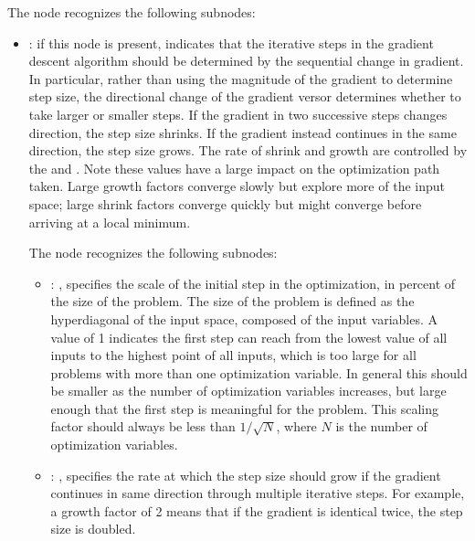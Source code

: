 \begin{itemize}
      The  node recognizes the following subnodes:
      \begin{itemize}
        \item {}:
          if this node is present, indicates that the iterative steps in the gradient
          descent algorithm should be determined by the sequential change in gradient. In
          particular, rather         than using the magnitude of the gradient to determine step
          size, the directional change of the         gradient versor determines whether to take
          larger or smaller steps. If the gradient in two successive         steps changes
          direction, the step size shrinks. If the gradient instead continues in the same
          direction, the step size grows. The rate of shrink and growth are controlled by the
                   and . Note these values have a large
          impact on the optimization path taken.         Large growth factors converge slowly but
          explore more of the input space; large shrink factors         converge quickly but might
          converge before arriving at a local minimum.

          The  node recognizes the following subnodes:
          \begin{itemize}
            \item {}: , 
              specifies the scale of the initial step in the optimization, in percent of the
              size of the problem. The size of the problem is defined as the hyperdiagonal of the
              input space, composed of the input variables. A value of 1 indicates the first step
              can reach from the lowest value of all inputs to the highest point of all inputs,
              which is too large for all problems with more than one optimization variable. In
              general this               should be smaller as the number of optimization variables
              increases, but large enough               that the first step is meaningful for the
              problem. This scaling factor should always               be less than $1/\sqrt{N}$,
              where $N$ is the number of optimization variables. 

            \item {}: , 
              specifies the rate at which the step size should grow if the gradient continues in
              same direction through multiple iterative steps. For example, a growth factor of 2
              means               that if the gradient is identical twice, the step size is doubled.


\end{itemize}
\end{itemize}
\end{itemize}
